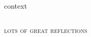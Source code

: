 \documentclass[aspectratio=43,17pt]{beamer} %
\begin{document}
\begin{frame}{context}
\begin{columns}
\begin{column}{0.6\textwidth}

\end{column}
\end{columns}
\end{frame}



\begin{frame}[plain]

\centering




\end{frame}


\begin{frame}[plain]
\centering
{\scshape\large lots of great reflections}
\end{frame}
\end{document}

